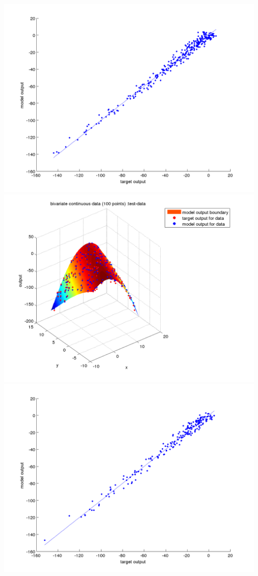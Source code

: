 \documentclass[fleqn]{article}
\begin{document}
\includegraphics[scale=0.4]{./pics/bivariate100/_2_4/_2_4_epoch_Inf_validation-data_scatter2d}
\includegraphics[scale=0.4]{./pics/bivariate100/_2_4/_2_4_epoch_Inf_test-data_scatter3d}
\includegraphics[scale=0.4]{./pics/bivariate100/_2_4/_2_4_epoch_Inf_test-data_scatter2d}
\end{document}
